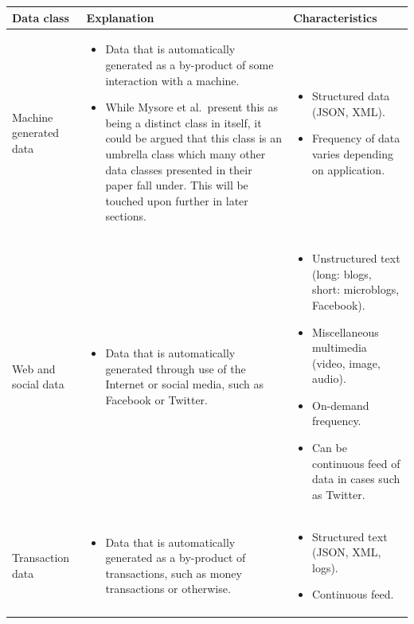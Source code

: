 \documentclass[a4paper,11pt]{article}
\begin{document}
\hspace*{-3cm}
\begingroup
\fontsize{8pt}{10pt}\selectfont
\begin{tabular}{ | p{1.5cm} | p{8cm} | p{8cm} | }
  \hline
  \textbf{Data class}          &  \textbf{Explanation} & \textbf{Characteristics}   \\ \hline

  Machine generated data
  &
  \begin{itemize}
    \item Data that is automatically generated as a by-product of some interaction with a machine.
    \item While Mysore et al.\ present this as being a distinct class in itself, it could be argued that this class
    is an umbrella class which many other data classes presented in their paper fall under. This will be touched upon
    further in later sections.
  \end{itemize}
  &
  \begin{itemize}
    \item Structured data (JSON, XML).
    \item Frequency of data varies depending on application.
  \end{itemize}
  \\ \hline

  Web and social data
  &
  \begin{itemize}
    \item Data that is automatically generated through use of the Internet or social media, such as Facebook or Twitter.
  \end{itemize}
  &
  \begin{itemize}
    \item Unstructured text (long: blogs, short: microblogs, Facebook).
    \item Miscellaneous multimedia (video, image, audio).
    \item On-demand frequency.
    \item Can be continuous feed of data in cases such as Twitter.
  \end{itemize}
  \\ \hline

  Transaction data
  &
  \begin{itemize}
    \item Data that is automatically generated as a by-product of transactions, such as money transactions or otherwise.
  \end{itemize}
  &
  \begin{itemize}
    \item Structured text (JSON, XML, logs).
    \item Continuous feed.
  \end{itemize}
  \\ \hline


\end{tabular}
\end{document}
